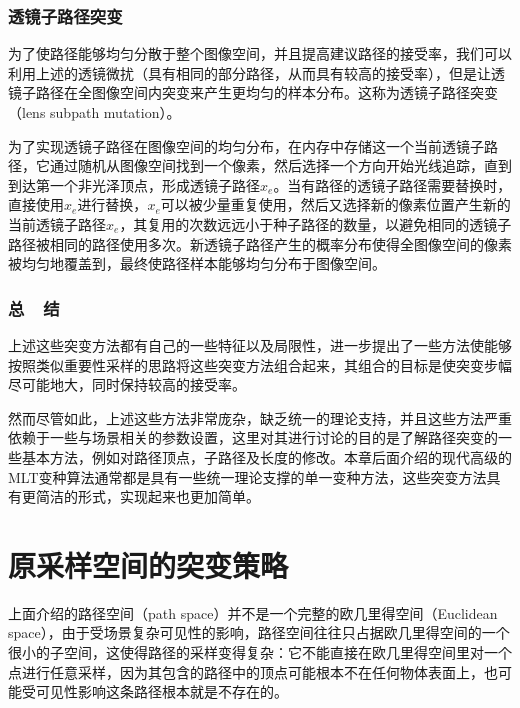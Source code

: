 \subsubsection{透镜子路径突变}
为了使路径能够均匀分散于整个图像空间，并且提高建议路径的接受率，我们可以利用上述的透镜微扰（具有相同的部分路径，从而具有较高的接受率），但是让透镜子路径在全图像空间内突变来产生更均匀的样本分布。这称为透镜子路径突变（lens subpath mutation）。

为了实现透镜子路径在图像空间的均匀分布，\cite{a:MetropolisLightTransport}在内存中存储这一个当前透镜子路径，它通过随机从图像空间找到一个像素，然后选择一个方向开始光线追踪，直到到达第一个非光泽顶点，形成透镜子路径${x}_e$。当有路径的透镜子路径需要替换时，直接使用${x}_e$进行替换，${x}_e$可以被少量重复使用，然后又选择新的像素位置产生新的当前透镜子路径${x}_e$，其复用的次数远远小于种子路径的数量，以避免相同的透镜子路径被相同的路径使用多次。新透镜子路径产生的概率分布使得全图像空间的像素被均匀地覆盖到，最终使路径样本能够均匀分布于图像空间。




\subsubsection{总~~结}
上述这些突变方法都有自己的一些特征以及局限性，\cite{a:MetropolisLightTransport}进一步提出了一些方法使能够按照类似重要性采样的思路将这些突变方法组合起来，其组合的目标是使突变步幅尽可能地大，同时保持较高的接受率。

然而尽管如此，上述这些方法非常庞杂，缺乏统一的理论支持，并且这些方法严重依赖于一些与场景相关的参数设置，这里对其进行讨论的目的是了解路径突变的一些基本方法，例如对路径顶点，子路径及长度的修改。本章后面介绍的现代高级的MLT变种算法通常都是具有一些统一理论支撑的单一变种方法，这些突变方法具有更简洁的形式，实现起来也更加简单。




\section{原采样空间的突变策略}\label{sec:mlt-pssmlt}
上面介绍的路径空间（path space）并不是一个完整的欧几里得空间（Euclidean space），由于受场景复杂可见性的影响，路径空间往往只占据欧几里得空间的一个很小的子空间，这使得路径的采样变得复杂：它不能直接在欧几里得空间里对一个点进行任意采样，因为其包含的路径中的顶点可能根本不在任何物体表面上，也可能受可见性影响这条路径根本就是不存在的。

